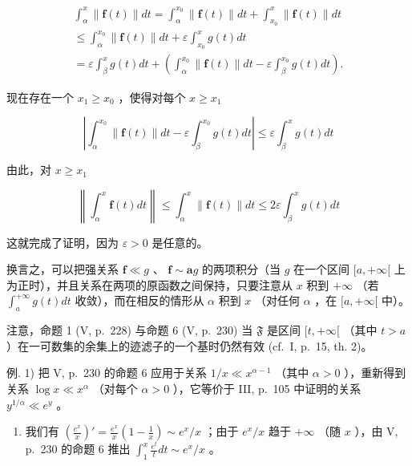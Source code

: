 \[
\begin{array}{l} \int_ {\alpha} ^ {x} \| \mathbf {f} (t) \| d t = \int_ {\alpha} ^ {x _ {0}} \| \mathbf {f} (t) \| d t + \int_ {x _ {0}} ^ {x} \| \mathbf {f} (t) \| d t \\ \leqslant \int_ {\alpha} ^ {x _ {0}} \| \mathbf {f} (t) \| d t + \varepsilon \int_ {x _ {0}} ^ {x} g (t) d t \\ = \varepsilon \int_ {\beta} ^ {x} g (t) d t + \left(\int_ {\alpha} ^ {x _ {0}} \| \mathbf {f} (t) \| d t - \varepsilon \int_ {\beta} ^ {x _ {0}} g (t) d t\right). \end{array}
\]

现在存在一个 \(x_{1} \geqslant x_{0}\) ，使得对每个 \(x \geqslant x_{1}\)

\[
\left| \int_ {\alpha} ^ {x _ {0}} \| \mathbf {f} (t) \| d t - \varepsilon \int_ {\beta} ^ {x _ {0}} g (t) d t \right| \leqslant \varepsilon \int_ {\beta} ^ {x} g (t) d t
\]

由此，对 \(x \geqslant x_1\)

\[
\left\| \int_ {\alpha} ^ {x} \mathbf {f} (t) d t \right\| \leqslant \int_ {\alpha} ^ {x} \| \mathbf {f} (t) \| d t \leqslant 2 \varepsilon \int_ {\beta} ^ {x} g (t) d t
\]

这就完成了证明，因为 \(\varepsilon > 0\) 是任意的。

换言之，可以把强关系 \(\mathbf{f} \ll g\) 、 \(\mathbf{f} \sim \mathbf{a}g\) 的两项积分（当 \(g\) 在一个区间 \([a, +\infty[\) 上为正时），并且关系在两项的原函数之间保持，只要注意从 \(x\) 积到 \(+\infty\) （若 \(\int_{a}^{+\infty} g(t) dt\) 收敛），而在相反的情形从 \(\alpha\) 积到 \(x\) （对任何 \(\alpha\) ，在 \([a, +\infty[\) 中）。

注意，命题 1 (V, p.~228) 与命题 6 (V, p.~230) 当 \(\mathfrak{F}\) 是区间 \([t, +\infty[\) （其中 \(t > a\) ）在一可数集的余集上的迹滤子的一个基时仍然有效 (cf.~I, p.~15, th. 2)。

例. 1) 把 V, p.~230 的命题 6 应用于关系 \(1 / x \ll x^{\alpha - 1}\) （其中 \(\alpha > 0\) ），重新得到关系 \(\log x \ll x^{\alpha}\) （对每个 \(\alpha > 0\) ），它等价于 III, p.~105 中证明的关系 \(y^{1 / \alpha} \ll e^{y}\) 。

\begin{enumerate}
\def\labelenumi{\arabic{enumi})}
\setcounter{enumi}{1}
\tightlist
\item
  我们有 \(\left(\frac{e^x}{x}\right)' = \frac{e^x}{x}\left(1 - \frac{1}{x}\right) \sim e^x / x\) ；由于 \(e^x / x\) 趋于 \(+\infty\) （随 \(x\) ），由 V, p.~230 的命题 6 推出 \(\int_{1}^{x} \frac{e^t}{t} dt \sim e^x / x\) 。
\end{enumerate}

